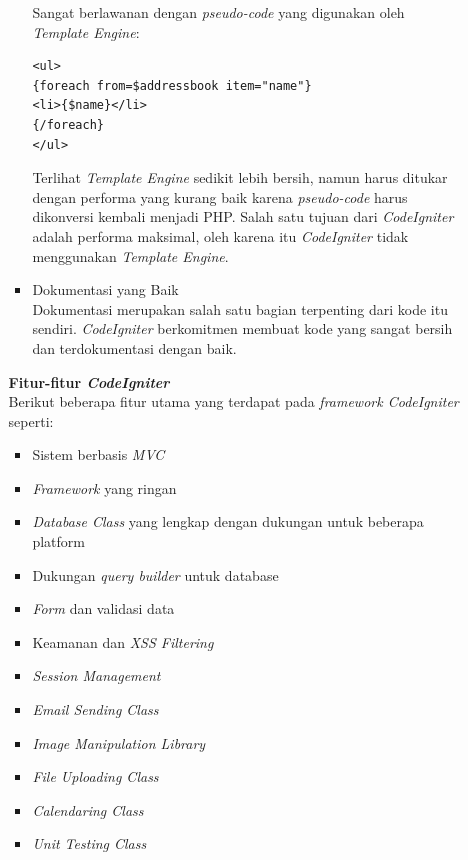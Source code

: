 \documentclass[a4paper,twoside]{article}
\begin{document}
\begin{enumerate}
\begin{enumerate}
\begin{itemize}
				Sangat berlawanan dengan \textit{pseudo-code} yang digunakan oleh \textit{Template Engine}: 
				\begin{lstlisting}[backgroundcolor = \color{lightgray}]
<ul>
{foreach from=$addressbook item="name"}
<li>{$name}</li>
{/foreach}
</ul>
				\end{lstlisting}
				Terlihat \textit{Template Engine} sedikit lebih bersih, namun harus ditukar dengan performa yang kurang baik karena \textit{pseudo-code} harus dikonversi kembali menjadi PHP. Salah satu tujuan dari \textit{CodeIgniter} adalah performa maksimal, oleh karena itu \textit{CodeIgniter} tidak menggunakan \textit{Template Engine}.
				\item Dokumentasi yang Baik \\
				Dokumentasi merupakan salah satu bagian terpenting dari kode itu sendiri. \textit{CodeIgniter} berkomitmen membuat kode yang sangat bersih dan terdokumentasi dengan baik. 
			\end{itemize}
			
			\textbf{Fitur-fitur \textit{CodeIgniter}} \\
			Berikut beberapa fitur utama yang terdapat pada \textit{framework CodeIgniter} seperti:
			\begin{itemize}
				\item Sistem berbasis \textit{MVC}
				\item \textit{Framework} yang ringan
				\item \textit{Database Class} yang lengkap dengan dukungan untuk beberapa platform
				\item Dukungan \textit{query builder} untuk database
				\item \textit{Form} dan validasi data
				\item Keamanan dan \textit{XSS Filtering}
				\item \textit{Session Management}
				\item \textit{Email Sending Class}
				\item \textit{Image Manipulation Library}
				\item \textit{File Uploading Class} 
				\item \textit{Calendaring Class}
				\item \textit{Unit Testing Class}
			\end{itemize}
			

\end{enumerate}
\end{enumerate}
\end{document}
